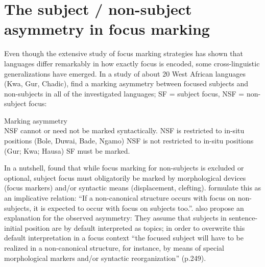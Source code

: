 \documentclass[output=paper,colorlinks,citecolor=brown]{langscibook}
\begin{document}
\section{The subject / non-subject asymmetry in focus marking}\label{sec:amaechi:4}

Even though the extensive study of focus marking strategies has shown that languages differ remarkably in how exactly focus is encoded, some cross-linguistic  generalizations have  emerged. In a study of about 20 West African languages (Kwa, Gur, Chadic), \citet{FiedlerEtAl2010} find a marking asymmetry between focused subjects and non-subjects in all of the investigated languages;
SF = subject focus, NSF = non-subject focus:

\ea%
    \label{ex:amaechi:14} 
    Marking asymmetry \citealt[242,~ex. (11)]{FiedlerEtAl2010}\\
    \ea\label{ex:amaechi:14a}
        NSF cannot or need not be marked syntactically.
        \ea\label{ex:amaechi:14ai}
            NSF is restricted to in-situ positions (Bole, Duwai, Bade, Ngamo)
        \ex\label{ex:amaechi:14aii} 
            NSF is not restricted to in-situ positions (Gur; Kwa; Hausa)
        \z
    \ex\label{ex:amaechi:14b}
        SF must be marked.
    \z
\z

In a nutshell, \citet{FiedlerEtAl2010} found that while focus marking for non-subjects is excluded or optional, subject focus must obligatorily be marked by morphological devices (focus markers) and/or syntactic means (displacement, clefting). \citet[171f]{SkopeteasFanselow2010} formulate this as an implicative relation: ``If a non-canonical structure occurs with focus on non-subjects, it is expected to occur with focus on subjects too.''. \citet{FiedlerEtAl2010} also propose an explanation for the observed asymmetry:  They assume that subjects in sentence-initial position are by default interpreted as topics; in order to overwrite this default interpretation in a focus context ``the focused subject will have to be realized in a non-canonical structure, for instance, by means of special morphological markers and/or syntactic reorganization'' (p.249).
\end{document}
